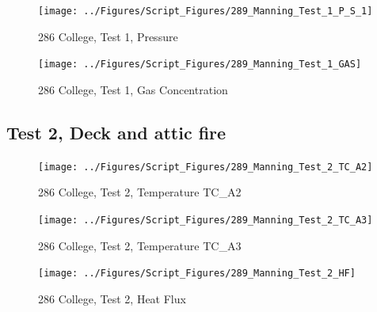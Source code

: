 \documentclass[12pt,oneside]{book}
\begin{document}
\begin{figure}[!ht]
\texttt{[image: ../Figures/Script\_Figures/289\_Manning\_Test\_1\_P\_S\_1]}
\caption{286 College, Test 1, Pressure}
\label{fig:289_Manning_Test_1_P_S_1}
\end{figure}

\begin{figure}[!ht]
\texttt{[image: ../Figures/Script\_Figures/289\_Manning\_Test\_1\_GAS]}
\caption{286 College, Test 1, Gas Concentration}
\label{fig:289_Manning_Test_1_GAS}
\end{figure}


\clearpage


\subsection{Test 2, Deck and attic fire}

\begin{figure}[!ht]
\texttt{[image: ../Figures/Script\_Figures/289\_Manning\_Test\_2\_TC\_A2]}
\caption{286 College, Test 2, Temperature TC\_A2}
\label{fig:289_Manning_Test_2_TC_A2}
\end{figure}

\begin{figure}[!ht]
\texttt{[image: ../Figures/Script\_Figures/289\_Manning\_Test\_2\_TC\_A3]}
\caption{286 College, Test 2, Temperature TC\_A3}
\label{fig:289_Manning_Test_2_TC_A3}
\end{figure}

\begin{figure}[!ht]
\texttt{[image: ../Figures/Script\_Figures/289\_Manning\_Test\_2\_HF]}
\caption{286 College, Test 2, Heat Flux}
\label{fig:289_Manning_Test_2_HF}
\end{figure}
\end{document}
